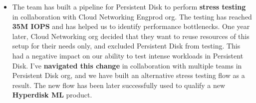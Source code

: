 \documentclass[10pt,a4paper,sans]{moderncv}
\begin{document}
{\begin{itemize}
\begin{itemize}
			\item The team has built a pipeline for Persistent Disk to perform \textbf{stress testing} in collaboration with Cloud Networking Engprod org. The testing has reached \textbf{35M IOPS} and has helped us to identify performance bottlenecks. One year later, Cloud Networking org decided that they want to reuse resources of this setup for their needs only, and excluded Persistent Disk from testing. This had a negative impact on our ability to test intense workloads in Persistent Disk. I've \textbf{navigated this change} in collaboration with multiple teams in Persistent Disk org, and we have built an alternative stress testing flow as a result. The new flow has been later successfully used to qualify a new \textbf{Hyperdisk ML} product.
		\end{itemize}
	\end{itemize}
}
\end{document}
